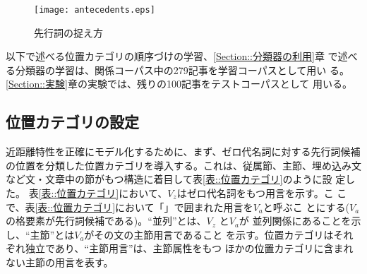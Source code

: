 \documentclass{nlp}
\begin{document}
\begin{figure}[t]
 \begin{center}
  \texttt{[image: antecedents.eps]} \caption{先行詞の捉え方}
  \label{Figure::ZeroRecognition}
 \end{center} 
\end{figure}

以下で述べる位置カテゴリの順序づけの学習、\ref{Section::分類器の利用}章
で述べる分類器の学習は、関係コーパス中の279記事を学習コーパスとして用い
る。\ref{Section::実験}章の実験では、残りの100記事をテストコーパスとして
用いる。


\subsection{位置カテゴリの設定}

近距離特性を正確にモデル化するために、まず、ゼロ代名詞に対する先行詞候補
の位置を分類した位置カテゴリを導入する。これは、従属節、主節、埋め込み文
など文・文章中の節がもつ構造に着目して表\ref{表::位置カテゴリ}のように設
定した。
表\ref{表::位置カテゴリ}において、$V_z$はゼロ代名詞をもつ用言を示す。こ
こで、表\ref{表::位置カテゴリ}において「」で囲まれた用言を$V_a$と呼ぶこ
とにする($V_a$の格要素が先行詞候補である)。``並列''とは、$V_z$ と$V_a$が
並列関係にあることを示し、``主節''とは$V_a$がその文の主節用言であること
を示す。位置カテゴリはそれぞれ独立であり、``主節用言''は、主節属性をもつ
ほかの位置カテゴリに含まれない主節の用言を表す。
\end{document}
